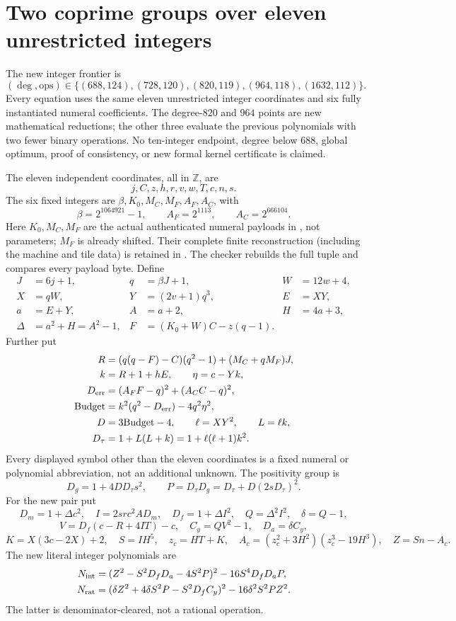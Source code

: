 \section{Two coprime groups over eleven unrestricted integers}
\label{sec:integer-two-groups}
The new integer frontier is
\[
 (\deg,\mathrm{ops})\in\{(688,124),(728,120),(820,119),(964,118),(1632,112)\}.
\]
Every equation uses the same eleven unrestricted integer coordinates and six
fully instantiated numeral coefficients. The degree-$820$ and $964$ points are new
mathematical reductions; the other three evaluate the previous polynomials
with two fewer binary operations. No ten-integer endpoint, degree below $688$,
global optimum, proof of consistency, or new formal kernel certificate is claimed.

The eleven independent coordinates, all in $\mathbb Z$, are
\[
 j,C,z,h,r,v,w,T,c,n,s.
\]
The six fixed integers are $\beta,K_0,M_C,M_F,A_F,A_C$, with
\[
 \beta=2^{1064921}-1,\qquad A_F=2^{1113},\qquad A_C=2^{666104}.
\]
Here $K_0,M_C,M_F$ are the actual authenticated numeral payloads in
, not parameters; $M_F$ is
already shifted. Their complete finite reconstruction (including the
machine and tile data) is retained in .
The checker rebuilds the full tuple and compares every payload byte.
Define
\begin{align*}
 J&=6j+1,&q&=\beta J+1,&W&=12w+4,\\
 X&=qW,&Y&=(2v+1)q^3,&E&=XY,\\
 a&=E+Y,&A&=a+2,&H&=4a+3,\\
 \Delta&=a^2+H=A^2-1,
 &F&=(K_0+W)C-z(q-1).
\end{align*}
Further put
\begin{align*}
 R&=(q(q-F)-C)(q^2-1)+(M_C+qM_F)J,\\
 k&=R+1+hE,\qquad \eta=c-Yk,\\
 D_{\rm err}&=(A_FF-q)^2+(A_CC-q)^2,\\
 \mathrm{Budget}&=k^2(q^2-D_{\rm err})-4q^2\eta^2,\\
 D&=3\mathrm{Budget}-4,\qquad \ell=XY^2,\qquad L=\ell k,\\
 D_\tau&=1+L(L+k)=1+\ell(\ell+1)k^2.
\end{align*}
Every displayed symbol other than the eleven coordinates is a fixed
numeral or polynomial abbreviation, not an additional unknown.
The positivity group is
\[
 D_g=1+4DD_\tau s^2,\qquad
 P=D_\tau D_g=D_\tau+D(2sD_\tau)^2.
\]
For the new pair put
\[
 D_m=1+\Delta c^2,\quad I=2src^2AD_m,\quad
 D_f=1+\Delta I^2,\quad Q=\Delta^2I^2,\quad\delta=Q-1,
\]
\[
 V=D_f(c-R+4IT)-c,\quad C_y=QV^2-1,\quad D_a=\delta C_y,
\]
\[
 K=X(3c-2X)+2,\quad S=IH^5,\quad z_c=HT+K,
\quad A_c=(z_c^2+3H^2)(z_c^3-19H^3),\quad Z=Sn-A_c.
\]
The new literal integer polynomials are
\begin{align*}
 N_{\rm int}&=(Z^2-S^2D_fD_a-4S^2P)^2-16S^4D_fD_aP,\\
 N_{\rm rat}&=(\delta Z^2+4\delta S^2P-S^2D_fC_y)^2
                  -16\delta^2S^2PZ^2.
\end{align*}
The latter is denominator-cleared, not a rational operation.

